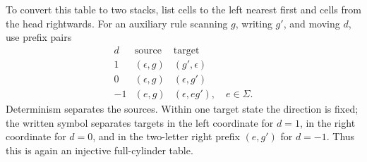 To convert this table to two stacks, list cells to the left nearest first and cells from the head rightwards.  For an auxiliary rule scanning $g$, writing $g'$, and moving $d$, use prefix pairs
\[
\begin{array}{c|c|c}
d&\text{source}&\text{target}\\\hline
1&(\epsilon,g)&(g',\epsilon)\\
0&(\epsilon,g)&(\epsilon,g')\\
-1&(e,g)&(\epsilon,eg'),\quad e\in\Sigma.
\end{array}
\]
Determinism separates the sources.  Within one target state the direction is fixed; the written symbol separates targets in the left coordinate for $d=1$, in the right coordinate for $d=0$, and in the two-letter right prefix $(e,g')$ for $d=-1$.  Thus this is again an injective full-cylinder table.

